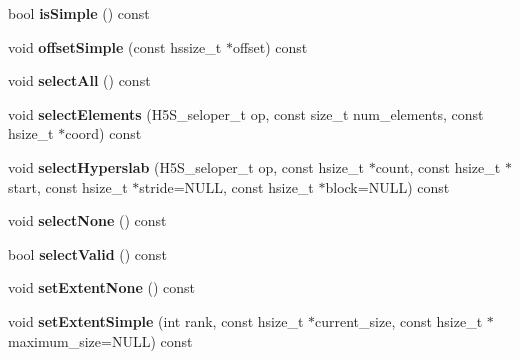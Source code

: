 \begin{DoxyCompactItemize}
\mbox{\label{class_h5_1_1_data_space_a5c61542b05501795edd38720783ec689}} 
bool {\bfseries is\+Simple} () const
\item 
\mbox{\label{class_h5_1_1_data_space_a44d006469b3939a3b573d90a2df783ea}} 
void {\bfseries offset\+Simple} (const hssize\+\_\+t $\ast$offset) const
\item 
\mbox{\label{class_h5_1_1_data_space_abe4eb70c76aaed5b35e10aa487f6293a}} 
void {\bfseries select\+All} () const
\item 
\mbox{\label{class_h5_1_1_data_space_a4f0c94427e21244f01b56a2bb51c632d}} 
void {\bfseries select\+Elements} (H5\+S\+\_\+seloper\+\_\+t op, const size\+\_\+t num\+\_\+elements, const hsize\+\_\+t $\ast$coord) const
\item 
\mbox{\label{class_h5_1_1_data_space_a65cdbebc5d97c88140a16030b0f9d6d2}} 
void {\bfseries select\+Hyperslab} (H5\+S\+\_\+seloper\+\_\+t op, const hsize\+\_\+t $\ast$count, const hsize\+\_\+t $\ast$start, const hsize\+\_\+t $\ast$stride=N\+U\+LL, const hsize\+\_\+t $\ast$block=N\+U\+LL) const
\item 
\mbox{\label{class_h5_1_1_data_space_a0313175c25ee2b71a59c1939642ce147}} 
void {\bfseries select\+None} () const
\item 
\mbox{\label{class_h5_1_1_data_space_a5b220f3dd3250e399db8b56560c6af64}} 
bool {\bfseries select\+Valid} () const
\item 
\mbox{\label{class_h5_1_1_data_space_a0608208be8e3fdf368222c832c583aaa}} 
void {\bfseries set\+Extent\+None} () const
\item 
\mbox{\label{class_h5_1_1_data_space_af2dc5b33c4718e4ee4c117aa1e6fb397}} 
void {\bfseries set\+Extent\+Simple} (int rank, const hsize\+\_\+t $\ast$current\+\_\+size, const hsize\+\_\+t $\ast$maximum\+\_\+size=N\+U\+LL) const
\item 
\mbox{\label{class_h5_1_1_data_space_a127e32a992f905e055ba1576d18c7d1f}} 

\end{DoxyCompactItemize}
